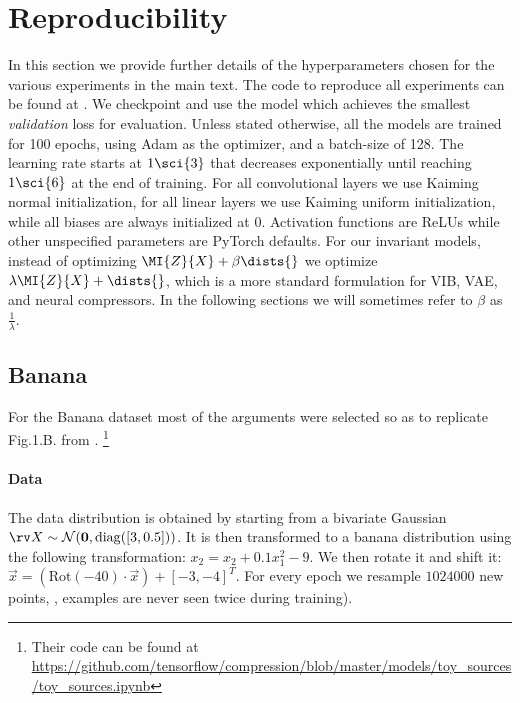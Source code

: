 \documentclass[final]{article}
\begin{document}
\section{Reproducibility}
\label{appx:reproducability}
In this section we provide further details of the hyperparameters chosen for the various experiments in the main text.
The code to reproduce all experiments can be found at \codeurl{}.
We checkpoint and use the model which achieves the smallest \textit{validation} loss for evaluation.
Unless stated otherwise, all the models are trained for 100 epochs, using Adam \cite{kingma_adam_2015} as the optimizer, and a batch-size of 128. 
The learning rate starts at $1\sci{3}$ that decreases exponentially until reaching $1\sci{6}$ at the end of training.
For all convolutional layers we use Kaiming normal initialization\cite{he_delving_2015}, for all linear layers we use Kaiming uniform initialization\cite{he_delving_2015},  while all biases are always initialized at 0.
Activation functions are ReLUs while other unspecified parameters are PyTorch \cite{paszke_pytorch_2019} defaults.
For our invariant models, instead of optimizing $\MI{Z}{X} + \beta \dists{}$ we optimize $\lambda \MI{Z}{X} + \dists{}$, which is a more standard formulation for VIB, VAE, and neural compressors.
In the following sections we will sometimes refer to $\beta$ as $\frac{1}{\lambda}$.

\subsection{Banana}
\label{appx:reproducability_banana}

For the Banana dataset most of the arguments were selected so as to replicate Fig.1.B. from \cite{balle_nonlinear_2020}. 
\footnote{Their code can be found at \url{https://github.com/tensorflow/compression/blob/master/models/toy_sources/toy_sources.ipynb}} 

\paragraph{Data}
The data distribution is obtained by starting from a bivariate Gaussian $\rv X \sim \mathcal{N}( \mathbf{0}, \mathrm{diag}([3, 0.5]) )$.
It is then transformed to a banana distribution using the following transformation: $x_2 = x_2 + 0.1  x_1 ^ 2 - 9$.
We then rotate it and shift it: $\vec x = (\mathrm{Rot}(-40) \cdot \vec x) + [-3, -4]^T$.
For every epoch we resample $1024000$ new points, \ie, examples are never seen twice during training).
\end{document}
